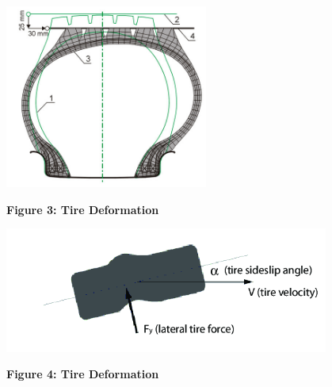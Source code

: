 \documentclass[12pt]{article}
\begin{document}
        \begin{center}
            \vspace{0.5cm}

            \includegraphics[width=0.5\textwidth]{resources/applsci-10-04326-g009-550.jpg}

            \vspace{0.5cm}

            \textbf{Figure 3: Tire Deformation} \autocite{app10124326}
            \label{tire_deformation_1}
        
        \end{center}

        \begin{center}
            \vspace{0.5cm}

            \includegraphics[width=0.8\textwidth]{resources/Lateral-tire-deformation.png}

            \vspace{0.5cm}

            \textbf{Figure 4: Tire Deformation} \autocite{inproceedings}
            \label{tire_deformation_2}
        
        \end{center}
\end{document}

